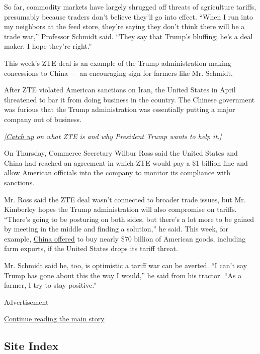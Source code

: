 So far, commodity markets have largely shrugged off threats of
agriculture tariffs, presumably because traders don't believe they'll go
into effect. ``When I run into my neighbors at the feed store, they're
saying they don't think there will be a trade war,'' Professor Schmidt
said. ``They say that Trump's bluffing; he's a deal maker. I hope
they're right.''

This week's ZTE deal is an example of the Trump administration making
concessions to China --- an encouraging sign for farmers like Mr.
Schmidt.

After ZTE violated American sanctions on Iran, the United States in
April threatened to bar it from doing business in the country. The
Chinese government was furious that the Trump administration was
essentially putting a major company out of business.

\emph{{[}}\href{https://www.nytimes.com/2018/06/07/business/what-is-zte.html}{\emph{Catch
up}} \emph{on what ZTE is and why President Trump wants to help it.{]}}

On Thursday, Commerce Secretary Wilbur Ross said the United States and
China had reached an agreement in which ZTE would pay a \$1 billion fine
and allow American officials into the company to monitor its compliance
with sanctions.

Mr. Ross said the ZTE deal wasn't connected to broader trade issues, but
Mr. Kimberley hopes the Trump administration will also compromise on
tariffs. ``There's going to be posturing on both sides, but there's a
lot more to be gained by meeting in the middle and finding a solution,''
he said. This week, for example,
\href{https://www.nytimes.com/2018/06/05/us/politics/china-trump-trade-tariffs.html}{China
offered} to buy nearly \$70 billion of American goods, including farm
exports, if the United States drops its tariff threat.

Mr. Schmidt said he, too, is optimistic a tariff war can be averted. ``I
can't say Trump has gone about this the way I would,'' he said from his
tractor. ``As a farmer, I try to stay positive.''

Advertisement

\protect\hyperlink{after-bottom}{Continue reading the main story}

\hypertarget{site-index}{%
\subsection{Site Index}\label{site-index}}

